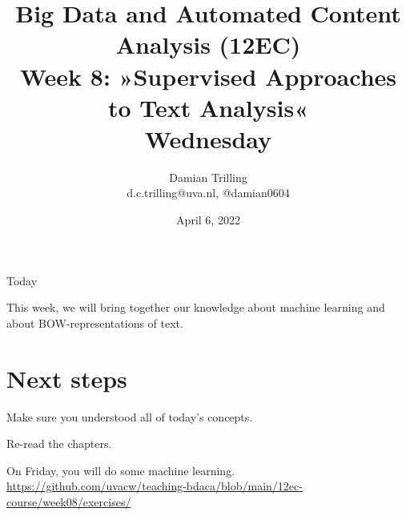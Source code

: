 

\graphicspath{{../../resources/img/}}




\title[Big Data and Automated Content Analysis]{\textbf{Big Data and Automated Content Analysis (12EC)} 
\\Week 8: »Supervised Approaches to Text Analysis«
\\Wednesday}
\author[Damian Trilling]{Damian Trilling\\ \footnotesize{d.c.trilling@uva.nl, @damian0604 \\}}
\date{April 6, 2022}


\begin{frame}{}
	\titlepage
\end{frame}

\begin{frame}{Today}
	\tableofcontents
\end{frame}




\begin{frame}[standout]
This week, we will bring together our knowledge about machine learning and about BOW-representations of text.
\end{frame}














\section{Next steps}

\begin{frame}[standout]
Make sure you understood all of today's concepts.

Re-read the chapters.

On Friday, you will do some machine learning. \large{\url{https://github.com/uvacw/teaching-bdaca/blob/main/12ec-course/week08/exercises/}}
\end{frame}





\begin{frame}
	\printbibliography
\end{frame}




